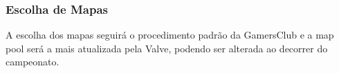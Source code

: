 \subsubsection{Escolha de Mapas}

A escolha dos mapas seguirá o procedimento padrão da GamersClub e a map pool será a mais atualizada pela Valve, podendo ser alterada ao decorrer do campeonato.
